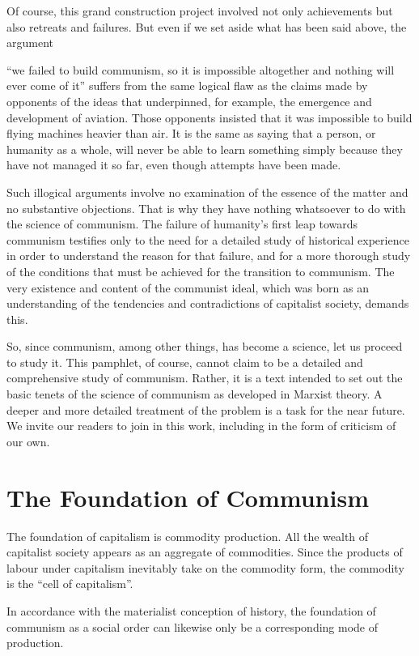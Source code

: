 \documentclass[12pt,a4paper,openany]{book}
\begin{document}
Of course, this grand construction project involved not only achievements but also retreats and failures. But even if we set aside what has been said above, the argument

“we failed to build communism, so it is impossible altogether and nothing will ever come of it” suffers from the same logical flaw as the claims made by opponents of the ideas that underpinned, for example, the emergence and development of aviation. Those opponents insisted that it was impossible to build flying machines heavier than air. It is the same as saying that a person, or humanity as a whole, will never be able to learn something simply because they have not managed it so far, even though attempts have been made.

Such illogical arguments involve no examination of the essence of the matter and no substantive objections. That is why they have nothing whatsoever to do with the science of communism. The failure of humanity’s first leap towards communism testifies only to the need for a detailed study of historical experience in order to understand the reason for that failure, and for a more thorough study of the conditions that must be achieved for the transition to communism. The very existence and content of the communist ideal, which was born as an understanding of the tendencies and contradictions of capitalist society, demands this.

So, since communism, among other things, has become a science, let us proceed to study it. This pamphlet, of course, cannot claim to be a detailed and comprehensive study of communism. Rather, it is a text intended to set out the basic tenets of the science of communism as developed in Marxist theory. A deeper and more detailed treatment of the problem is a task for the near future. We invite our readers to join in this work, including in the form of criticism of our own.
\ifSubfilesClassLoaded{\setcounter{page}{14}}{}
\section{The Foundation of Communism}
\label{sec:03_foundation}

The foundation of capitalism is commodity production. All the wealth of capitalist society appears as an aggregate of commodities. Since the products of labour under capitalism inevitably take on the commodity form, the commodity is the “cell of capitalism”.

In accordance with the materialist conception of history, the foundation of communism as a social order can likewise only be a corresponding mode of production.
\end{document}

